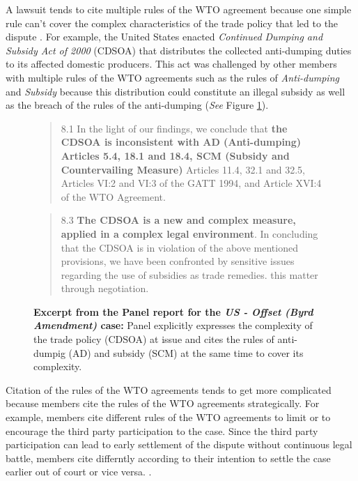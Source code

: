 A lawsuit tends to cite multiple rules of the WTO agreement because one simple rule can't cover the complex characteristics of the trade policy that led to the dispute \citep{palmeter2004dispute}.
For example, the United States enacted \textit{Continued Dumping and Subsidy Act of 2000} (CDSOA) that distributes
the collected anti-dumping duties to its affected domestic producers.
This act was challenged by other members with multiple rules of
the WTO agreements such as the rules of \textit{Anti-dumping} and \textit{Subsidy} because
this distribution could constitute an illegal subsidy as well as the breach of the rules of the anti-dumping (\textit{See} Figure \ref{fig:complex-measure}).

\begin{figure}[h]
    \begin{quote}
        8.1 In the light of our findings, we conclude that \textbf{the CDSOA is inconsistent with AD (Anti-dumping)
        Articles 5.4, 18.1 and 18.4, SCM (Subsidy and Countervailing Measure)} Articles 11.4, 32.1 and 32.5, Articles VI:2 and VI:3 of the GATT
        1994, and Article XVI:4 of the WTO Agreement.
    \end{quote} 
    \begin{quote}
        \centering{\ldots}
    \end{quote}
    \begin{quote}
        8.3 \textbf{The CDSOA is a new and complex measure, applied in a complex legal environment}. In
        concluding that the CDSOA is in violation of the above mentioned provisions, we have been
        confronted by sensitive issues regarding the use of subsidies as trade remedies.
        this matter through negotiation.
    \end{quote} 
    \caption{\textbf{Excerpt from the Panel report for the \textit{US - Offset (Byrd Amendment)} case:} Panel explicitly expresses the complexity of the trade policy (CDSOA) at issue and cites the rules of anti-dumpig (AD) and subsidy (SCM) at the same time to cover its complexity.}
    \label{fig:complex-measure}
\end{figure}


Citation of the rules of the WTO agreements tends to get more complicated because members cite the
rules of the WTO agreements strategically. For example,
members cite different rules of the WTO agreements to limit or to encourage
the third party participation to the case. Since the third party participation
can lead to early settlement of the dispute without continuous
legal battle, members cite differntly according to their intention to
settle the case earlier out of court or vice versa.
\citep{who_gets}.

